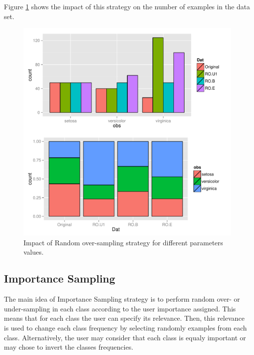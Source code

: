 \documentclass[10pt,a4paper]{article}\usepackage[]{graphicx}\usepackage[]{color}
\makeatletter
\def\maxwidth{ %
  \ifdim\Gin@nat@width>\linewidth
    \linewidth
  \else
    \Gin@nat@width
  \fi
}
\newenvironment{knitrout}{}{} %
\makeatother
\begin{document}
Figure \ref{fig:Iris_RO2} shows the impact of this strategy on the number of examples in the data set.

\begin{knitrout}\footnotesize
{}\color{fgcolor}\begin{figure}

{\centering \includegraphics[width=\maxwidth]{figures/UBL-Iris_RO2-1} 

}

\caption[Impact of Random over-sampling strategy for different parameters values]{Impact of Random over-sampling strategy for different parameters values.}\label{fig:Iris_RO2}
\end{figure}


\end{knitrout}

\subsection{Importance Sampling}\label{sec:ISClassif}

The main idea of Importance Sampling strategy is to perform random over- or under-sampling in each class according to the user importance assigned. This means that for each class the user can specify its relevance. Then, this relevance is used to change each class frequency by selecting randomly examples from each class. Alternatively, the user may consider that each class is equaly important or may chose to invert the classes frequencies.
\end{document}
